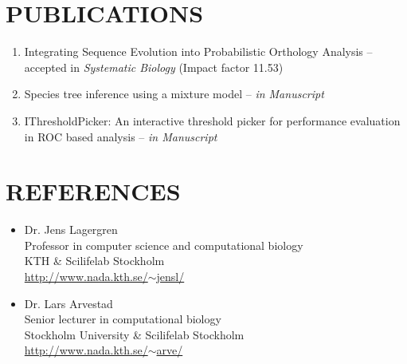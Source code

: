 \documentclass[margin, 10pt]{res} %
\begin{document}
\begin{resume}

\section{PUBLICATIONS} 
\begin{enumerate}
\item Integrating Sequence Evolution into Probabilistic Orthology Analysis -- accepted in {\sl Systematic Biology} (Impact factor 11.53)
\item Species tree inference using a mixture model -- {\sl in Manuscript}
\item IThresholdPicker: An interactive threshold picker for performance evaluation in ROC based analysis -- {\sl in Manuscript}
\end{enumerate}



\section{REFERENCES} 
\begin{itemize}
\item Dr. Jens Lagergren \\
Professor in computer science and computational biology \\
KTH \& Scilifelab Stockholm \\
\href{http://www.nada.kth.se/~jensl/}{http://www.nada.kth.se/$\sim$jensl/} 

\item Dr. Lars Arvestad \\
Senior lecturer in computational biology \\
Stockholm University \& Scilifelab Stockholm \\
\hfill \href{http://www.nada.kth.se/~arve/}{http://www.nada.kth.se/$\sim$arve/}
\end{itemize}


\end{resume}
\end{document}
